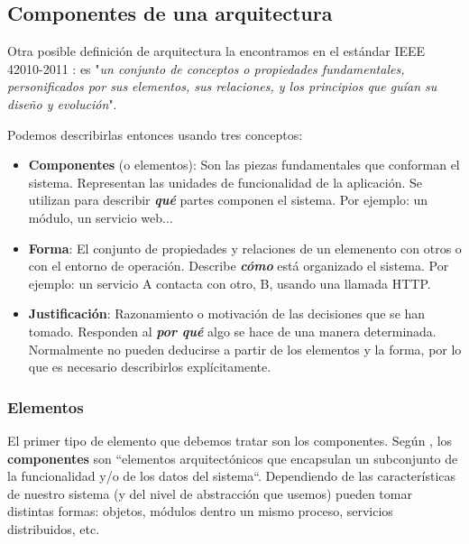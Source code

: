 \subsection{Componentes de una arquitectura}

Otra posible definición de arquitectura la encontramos en el estándar IEEE 42010-2011 \cite{ieeeStandard420102011Systems2011}: es "\emph{un conjunto de conceptos o propiedades fundamentales, personificados por sus elementos, sus relaciones, y los principios que guían su diseño y evolución}".

Podemos describirlas entonces usando tres conceptos: \cite{perryFoundationsStudySoftware1992}

    \begin{itemize}
        \item \textbf{Componentes} (o elementos): Son las piezas fundamentales que conforman el sistema. Representan las unidades de funcionalidad de la aplicación. Se utilizan para describir \textbf{\emph{qué}} partes componen el sistema. Por ejemplo: un módulo, un servicio web...

        \item \textbf{Forma}: El conjunto de propiedades y relaciones de un elemenento con otros o con el entorno de operación. Describe \textbf{\emph{cómo}} está organizado el sistema. Por ejemplo: un servicio A contacta con otro, B, usando una llamada HTTP.

        \item \textbf{Justificación}: Razonamiento o motivación de las decisiones que se han tomado. Responden al \textbf{\emph{por qué}} algo se hace de una manera determinada. Normalmente no pueden deducirse a partir de los elementos y la forma, por lo que es necesario describirlos explícitamente.

    \end{itemize}

\subsubsection{Elementos}

El primer tipo de elemento que debemos tratar son los componentes. Según \cite{taylorSoftwareArchitectureFoundations2009}, los \textbf{componentes} son ``elementos arquitectónicos que encapsulan un subconjunto de la funcionalidad y/o de los datos del sistema``.
Dependiendo de las características de nuestro sistema (y del nivel de abstracción que usemos) pueden tomar distintas formas: objetos, módulos dentro un mismo proceso, servicios distribuidos, etc.

